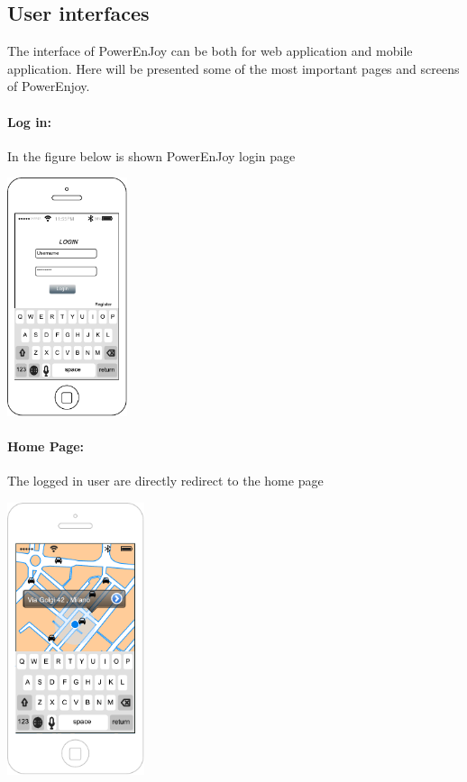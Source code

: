 \subsection{User interfaces}
The interface of PowerEnJoy can be both for web application and mobile application. Here will be presented some of the most important pages and screens of PowerEnjoy.

\paragraph{Log in:}
	In the figure below is shown PowerEnJoy login page
	\begin{center}
		\includegraphics[height=7cm]{Resources/LoginMockup.pdf}
	\end{center}
	
\paragraph{Home Page:}
	The logged in user are directly redirect to the home page
\begin{center}
	\includegraphics[height=8cm]{Resources/MapMockup.pdf}
\end{center}

